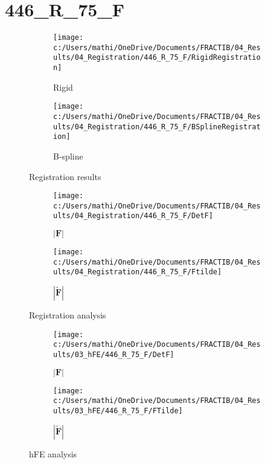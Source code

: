 \documentclass{article}%
\begin{document}
%
\newpage%
\section*{446\_R\_75\_F}%
\label{sec:446R75F}%


\begin{figure}[h!]%
\begin{subfigure}[b]{0.5\linewidth}%
\texttt{[image: c:/Users/mathi/OneDrive/Documents/FRACTIB/04\_Results/04\_Registration/446\_R\_75\_F/RigidRegistration]}%
\caption{Rigid}%
\end{subfigure}%
\begin{subfigure}[b]{0.5\linewidth}%
\texttt{[image: c:/Users/mathi/OneDrive/Documents/FRACTIB/04\_Results/04\_Registration/446\_R\_75\_F/BSplineRegistration]}%
\caption{B{-}spline}%
\end{subfigure}%
\caption{Registration results}%
\end{figure}

%


\begin{figure}[h!]%
\begin{subfigure}[b]{0.5\linewidth}%
\texttt{[image: c:/Users/mathi/OneDrive/Documents/FRACTIB/04\_Results/04\_Registration/446\_R\_75\_F/DetF]}%
\caption{$|\mathbf{F}|$}%
\end{subfigure}%
\begin{subfigure}[b]{0.5\linewidth}%
\texttt{[image: c:/Users/mathi/OneDrive/Documents/FRACTIB/04\_Results/04\_Registration/446\_R\_75\_F/Ftilde]}%
\caption{$|\widetilde{\mathbf{F}}|$}%
\end{subfigure}%
\caption{Registration analysis}%
\end{figure}

%


\begin{figure}[h!]%
\begin{subfigure}[b]{0.5\linewidth}%
\texttt{[image: c:/Users/mathi/OneDrive/Documents/FRACTIB/04\_Results/03\_hFE/446\_R\_75\_F/DetF]}%
\caption{$|\mathbf{F}|$}%
\end{subfigure}%
\begin{subfigure}[b]{0.5\linewidth}%
\texttt{[image: c:/Users/mathi/OneDrive/Documents/FRACTIB/04\_Results/03\_hFE/446\_R\_75\_F/FTilde]}%
\caption{$|\widetilde{\mathbf{F}}|$}%
\end{subfigure}%
\caption{hFE analysis}%
\end{figure}
\end{document}

